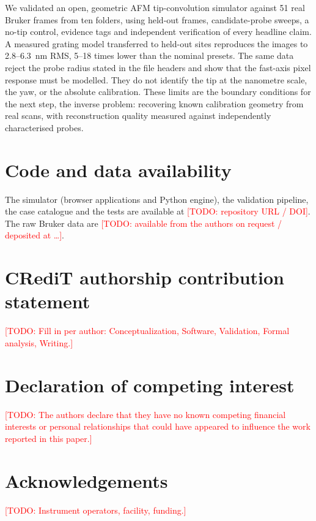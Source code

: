 \documentclass[preprint,12pt]{elsarticle}
\newcommand{\todo}[1]{\textcolor{red}{[TODO: #1]}}
\begin{document}
We validated an open, geometric AFM tip-convolution simulator against 51 real Bruker frames from
ten folders, using held-out frames, candidate-probe sweeps, a no-tip control, evidence tags and
independent verification of every headline claim. A measured grating model transferred to
held-out sites reproduces the images to 2.8--6.3~nm RMS, 5--18 times lower than the nominal
presets. The same data reject the probe radius stated in the file headers and show that the
fast-axis pixel response must be modelled. They do not identify the tip at the nanometre scale,
the yaw, or the absolute calibration. These limits are the boundary conditions for the next step,
the inverse problem: recovering known calibration geometry from real scans, with reconstruction
quality measured against independently characterised probes.

\section*{Code and data availability}
The simulator (browser applications and Python engine), the validation pipeline, the case
catalogue and the tests are available at \todo{repository URL / DOI}. The raw Bruker data are
\todo{available from the authors on request / deposited at \ldots}.

\section*{CRediT authorship contribution statement}
\todo{Fill in per author: Conceptualization, Software, Validation, Formal analysis, Writing.}

\section*{Declaration of competing interest}
\todo{The authors declare that they have no known competing financial interests or personal
relationships that could have appeared to influence the work reported in this paper.}

\section*{Acknowledgements}
\todo{Instrument operators, facility, funding.}



\end{document}
